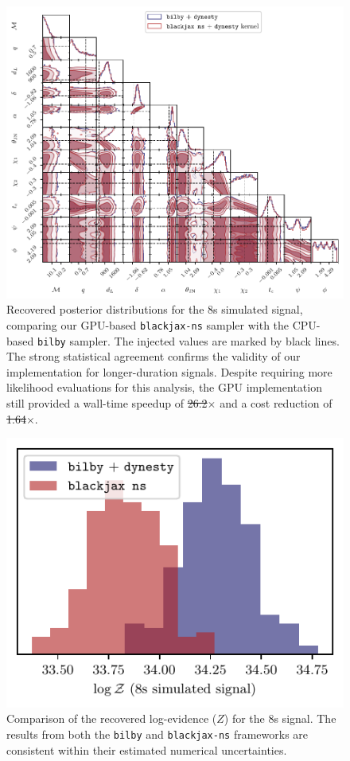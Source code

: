 \documentclass[fleqn,usenatbib]{mnras}
\providecommand{\DIFdel}[1]{{\protect\color{red}\sout{#1}}}                      %
\providecommand{\DIFdelFL}[1]{\DIFdel{#1}} %
\providecommand{\DIFaddbeginFL}{} %
\providecommand{\DIFaddendFL}{} %
\providecommand{\DIFdelbeginFL}{} %
\providecommand{\DIFdelendFL}{} %
\newcommand{\DIFscaledelfig}{0.5}
\newlength{\DIFdelgraphicswidth} %
\newlength{\DIFdelgraphicsheight} %
\newcommand{\DIFaddincludegraphics}[2][]{{\color{blue}\fbox{\DIFOincludegraphics[#1]{#2}}}} %
\newcommand{\DIFdelincludegraphics}[2][]{%
\sbox{\DIFdelgraphicsbox}{\DIFOincludegraphics[#1]{#2}}%
\settoboxwidth{\DIFdelgraphicswidth}{\DIFdelgraphicsbox} %
\settoboxtotalheight{\DIFdelgraphicsheight}{\DIFdelgraphicsbox} %
\scalebox{\DIFscaledelfig}{%
\parbox[b]{\DIFdelgraphicswidth}{\usebox{\DIFdelgraphicsbox}\\[-\baselineskip] \rule{\DIFdelgraphicswidth}{0em}}\llap{\resizebox{\DIFdelgraphicswidth}{\DIFdelgraphicsheight}{%
\setlength{\unitlength}{\DIFdelgraphicswidth}%
\begin{picture}(1,1)%
\thicklines\linethickness{2pt} %
{\color[rgb]{1,0,0}\put(0,0){\framebox(1,1){}}}%
{\color[rgb]{1,0,0}\put(0,0){\line( 1,1){1}}}%
{\color[rgb]{1,0,0}\put(0,1){\line(1,-1){1}}}%
\end{picture}%
}\hspace*{3pt}}} %
} %
\DeclareRobustCommand{\DIFaddbeginFL}{\DIFOaddbeginFL \let\includegraphics\DIFaddincludegraphics} %
\DeclareRobustCommand{\DIFaddendFL}{\DIFOaddendFL \let\includegraphics\DIFOincludegraphics} %
\DeclareRobustCommand{\DIFdelbeginFL}{\DIFOdelbeginFL \let\includegraphics\DIFdelincludegraphics} %
\DeclareRobustCommand{\DIFdelendFL}{\DIFOaddendFL \let\includegraphics\DIFOincludegraphics} %
\begin{document}
\begin{figure}
    \centering
    \includegraphics{figures/8s_corner_comparison.pdf}
    \caption{Recovered posterior distributions for the 8s simulated
    signal, comparing our GPU-based \texttt{blackjax-ns} sampler
    with the CPU-based \texttt{bilby} sampler. The injected values
    are marked by black lines. The strong statistical agreement confirms
    the validity of our implementation for longer-duration signals.
    Despite requiring more likelihood evaluations for this analysis, the
    GPU implementation still provided a wall-time speedup of
    \DIFdelbeginFL \DIFdelFL{26.2}\DIFdelendFL $\times$\DIFaddbeginFL {} \DIFaddendFL and a cost reduction of \DIFdelbeginFL \DIFdelFL{1.64}\DIFdelendFL $\times$\DIFaddbeginFL {}\DIFaddendFL .}
    \label{fig:8s_posteriors}
\end{figure}

\begin{figure}
    \centering
    \includegraphics{figures/8s_logZ_comparison.pdf}
    \caption{Comparison of the recovered log-evidence ($Z$) for the 8s
    signal. The results from both the \texttt{bilby} and
    \texttt{blackjax-ns} frameworks are consistent within their
    estimated numerical uncertainties.}
    \label{fig:8s_logZ}
\end{figure}
\end{document}
